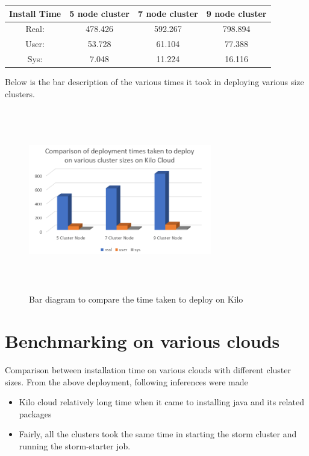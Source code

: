 \documentclass[9pt,twocolumn,twoside]{../../styles/osajnl}
\begin{document}
\begin{center}
 \begin{tabular}{|c|| c c c|} 
 \hline
 Install Time &  5 node cluster & 7 node cluster & 9 node cluster\\ [0.5ex]
 \hline\hline
 Real: & 478.426 & 592.267 & 798.894 \\ 
 \hline
 User: & 53.728 & 61.104 & 77.388 \\
 \hline
 Sys: & 7.048 & 11.224 & 16.116 \\
 \hline
\end{tabular}
\end{center}


Below is the bar description of the various times it took in deploying various size clusters.

\begin{figure}[!htb]
  \includegraphics[width=8cm,height=8cm,keepaspectratio,width=\linewidth]{images/bar-3.png}
  \caption{Bar diagram to compare the time taken to deploy on Kilo}
  \label{Bar diagram to compare the time taken to deploy on Kilo}
\end{figure}

\section{Benchmarking on various clouds}

Comparison between installation time on various clouds with different cluster sizes. From the above deployment, following inferences were made

\begin{itemize}
\item Kilo cloud relatively long time when it came to installing java and its related packages
\item Fairly, all the clusters took the same time in starting the storm cluster and running the storm-starter job.
\end{itemize}
\end{document}

